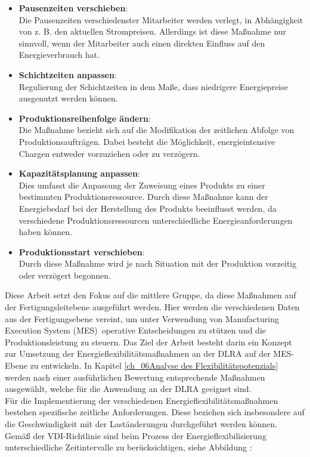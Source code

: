 \begin{itemize}[label={--}] %
	\item \textbf{Pausenzeiten verschieben}: \\Die Pausenzeiten verschiedenster Mitarbeiter werden verlegt, in Abhängigkeit von z. B. den aktuellen Strompreisen. Allerdings ist diese Maßnahme nur sinnvoll, wenn der Mitarbeiter auch einen direkten Einfluss auf den Energieverbrauch hat.
	\item \textbf{Schichtzeiten anpassen}: \\Regulierung der Schichtzeiten in dem Maße, dass niedrigere Energiepreise ausgenutzt werden können.
	\item \textbf{Produktionsreihenfolge ändern}: \\Die Maßnahme bezieht sich auf die Modifikation der zeitlichen Abfolge von Produktionsaufträgen. Dabei besteht die Möglichkeit, energieintensive Chargen entweder vorzuziehen oder zu verzögern.
	\item \textbf{Kapazitätsplanung anpassen}: \\Dies umfasst die Anpassung der Zuweisung eines Produkts zu einer bestimmten Produktionsressource. Durch diese Maßnahme kann der Energiebedarf bei der Herstellung des Produkts beeinflusst werden, da verschiedene Produktionsressourcen unterschiedliche Energieanforderungen haben können.
	\item \textbf{Produktionsstart verschieben}: \\Durch diese Maßnahme wird je nach Situation mit der Produktion vorzeitig oder verzögert begonnen.
\end{itemize}


Diese Arbeit setzt den Fokus auf die mittlere Gruppe, da diese Maßnahmen auf der Fertigungsleitebene ausgeführt werden. Hier werden die verschiedenen Daten aus der Fertigungsebene vereint, um unter Verwendung von \glqq Manufacturing Execution System (MES)\grqq~operative Entscheidungen zu stützen und die Produktionsleistung zu steuern. Das Ziel der Arbeit besteht darin ein Konzept zur Umsetzung der Energieflexibilitätsmaßnahmen an der DLRA auf der MES-Ebene zu entwickeln. In Kapitel \ref{ch_06Analyse des Flexibilitätspotenzials} werden nach einer ausführlichen Bewertung entsprechende Maßnahmen ausgewählt, welche für die Anwendung an der DLRA geeignet sind.\\

Für die Implementierung der verschiedenen Energieflexibilitätsmaßnahmen bestehen spezifische zeitliche Anforderungen. Diese beziehen sich insbesondere auf die Geschwindigkeit mit der Laständerungen durchgeführt werden können. Gemäß der VDI-Richtlinie \cite{VDI5207Blatt2020} sind beim Prozess der Energieflexibilisierung unterschiedliche Zeitintervalle zu berücksichtigen, siehe Abbildung :


